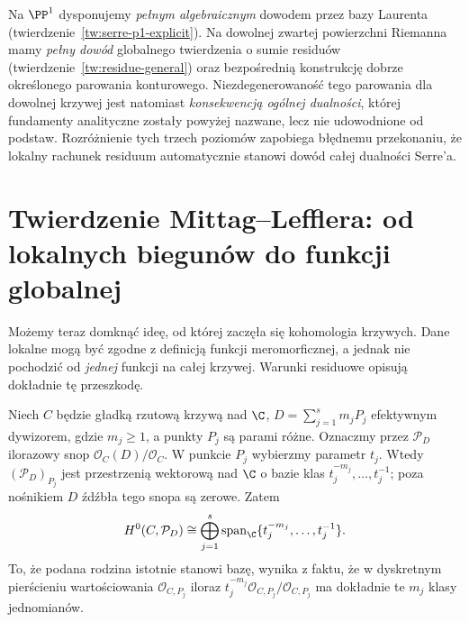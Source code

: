 \begin{przyklad}
Na $\PP^1$ dysponujemy \emph{pełnym algebraicznym}
dowodem przez bazy Laurenta
(twierdzenie~\ref{tw:serre-p1-explicit}).
Na dowolnej zwartej powierzchni Riemanna
mamy \emph{pełny dowód} globalnego twierdzenia
o sumie residuów (twierdzenie~\ref{tw:residue-general})
oraz bezpośrednią konstrukcję dobrze określonego
parowania konturowego. Niezdegenerowaność
tego parowania dla dowolnej krzywej jest
natomiast \emph{konsekwencją ogólnej dualności},
której fundamenty analityczne zostały powyżej
nazwane, lecz nie udowodnione od podstaw.
Rozróżnienie tych trzech poziomów zapobiega
błędnemu przekonaniu, że lokalny rachunek
residuum automatycznie stanowi dowód całej
dualności Serre'a.
\end{przyklad}


\section{Twierdzenie Mittag--Lefflera: od lokalnych biegunów do funkcji globalnej}
\label{sec:mittag-residue}

Możemy teraz domknąć ideę, od której zaczęła się
kohomologia krzywych. Dane lokalne mogą być zgodne
z definicją funkcji meromorficznej, a jednak nie
pochodzić od \emph{jednej} funkcji na całej krzywej.
Warunki residuowe opisują dokładnie tę przeszkodę.

\begin{definicja}
Niech $C$ będzie gładką rzutową krzywą nad $\C$,
$D=\sum_{j=1}^sm_jP_j$ efektywnym dywizorem,
gdzie $m_j\ge1$, a punkty $P_j$ są parami różne.
Oznaczmy przez $\mathcal P_D$ ilorazowy snop
$\mathcal O_C(D)/\mathcal O_C$.
W punkcie $P_j$ wybierzmy parametr $t_j$.
Wtedy $(\mathcal P_D)_{P_j}$ jest przestrzenią
wektorową nad $\C$ o bazie klas
$t_j^{-m_j},\ldots,t_j^{-1}$; poza nośnikiem $D$
źdźbła tego snopa są zerowe. Zatem
\[
 H^0(C,\mathcal P_D)\cong
 \bigoplus_{j=1}^s
 \operatorname{span}_{\C}
 \{t_j^{-m_j},\ldots,t_j^{-1}\}.
\]
To, że podana rodzina istotnie stanowi bazę,
wynika z faktu, że w dyskretnym pierścieniu
wartościowania $\mathcal O_{C,P_j}$ iloraz
$t_j^{-m_j}\mathcal O_{C,P_j}/\mathcal O_{C,P_j}$
ma dokładnie te $m_j$ klasy jednomianów.
\end{definicja}

